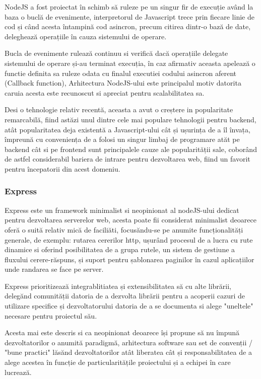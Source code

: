 \documentclass[12pt,a4paper,hidelinks]{report}
\theoremstyle{definition}
\theoremstyle{remark}
\begin{document}
NodeJS a fost proiectat în schimb să ruleze pe un singur fir de execuție
având la baza o buclă de evenimente, interpretorul de Javascript trece prin fiecare linie de cod și când acesta întampină cod asincron, precum citirea dintr-o bază de date, deleghează operațiile în cauza sistemului de operare.

Bucla de evenimente rulează continuu si verifică dacă operațiile delegate sistemului de operare și-au terminat execuția, în caz afirmativ aceasta apelează o functie definita sa ruleze odata cu finalul executiei codului asincron aferent
(Callback function), Arhitectura NodeJS-ului este principalul motiv datorita caruia  acesta este recunoscut si apreciat pentru scalabilitatea sa. 

Desi o tehnologie relativ recentă, aceasta a avut o creștere in popularitate
remarcabilă, fiind astăzi unul dintre cele mai populare tehnologii pentru backend, atât popularitatea deja existentă a Javascript-ului cât și ușurința de a îl învața, împreună cu 
conveniența de a folosi un singur limbaj de programare atăt pe backend cât si pe frontend sunt principalele cauze ale popularității sale, coborând de astfel considerabil
bariera de intrare pentru dezvoltarea web, fiind un favorit pentru începatorii din acest domeniu.
\subsubsection{Express}
Express este un framework minimalist si neopinionat al nodeJS-ului dedicat pentru dezvoltarea serverelor web, acesta poate fii considerat minimalist deoarece oferă
o suită relativ mică de faciliăti, focusăndu-se pe anumite funcționalități generale, de exemplu: rutarea cererilor http, ușurând procesul de a lucra cu rute dinamice si oferind posibilitatea de a grupa rutele, un sistem
de gestiune a fluxului cerere-răspuns, și suport pentru șablonarea paginilor în cazul aplicațiilor unde randarea se face pe server.

Express prioritizează integrablitiatea și extensibilitatea să cu alte librării, delegănd comunității datoria de a dezvolta librării pentru a acoperii cazuri de utilizare specifice și dezvoltatorului datoria de a se documenta si alege "uneltele" necesare pentru proiectul său.

Acesta mai este descris si ca neopinionat deoarece își propune să nu împună dezvoltatorilor o anumită paradigmă, arhitectura software
sau set de convenții / "bune practici" lăsănd dezvoltatorilor atât liberatea cât și responsabilitatea de a alege acestea în funcție de particularitățile proiectului și a echipei în care lucrează. 
\end{document}
